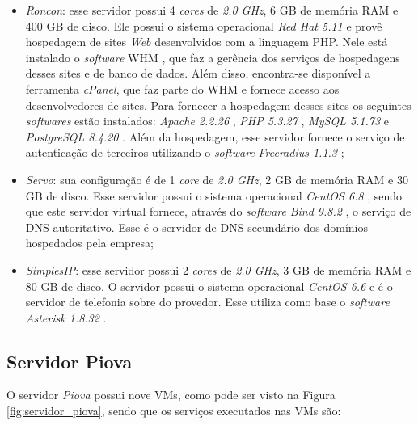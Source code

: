 \begin{itemize}
 \item \textit{Roncon}: esse servidor possui 4 \textit{cores} de \textit{2.0 GHz}, 6 GB de memória \ac{RAM} e 400 GB de disco. 
 Ele possui o sistema operacional \textit{Red Hat 5.11} \cite{redhat} e provê hospedagem de sites \textit{Web} desenvolvidos com a linguagem 
 \ac{PHP}. Nele está instalado o \textit{software} \ac{WHM} \cite{whm}, que faz a gerência dos serviços de hospedagens desses sites e de banco de 
 dados. Além disso, encontra-se disponível a ferramenta \textit{cPanel}, que faz parte do \ac{WHM} e fornece acesso aos desenvolvedores de
 sites. Para fornecer a hospedagem desses sites os seguintes \textit{softwares} estão instalados: \textit{Apache 2.2.26} \cite{apache}, 
 \textit{\ac{PHP} 5.3.27} \cite{php}, \textit{MySQL 5.1.73} \cite{mysql} e \textit{PostgreSQL 8.4.20} \cite{postgres}.
 Além da hospedagem, esse servidor fornece o serviço de autenticação  de terceiros utilizando o \textit{software} 
 \textit{Freeradius 1.1.3} \cite{freeradius};
 
 \item \textit{Servo}: sua configuração é de 1 \textit{core} de \textit{2.0 GHz}, 2 GB de memória \ac{RAM} e 30 GB de disco. 
 Esse servidor possui o sistema operacional \textit{CentOS 6.8} \cite{centos}, sendo que este servidor virtual fornece, através do \textit{software} 
 \textit{Bind 9.8.2} \cite{bind}, o serviço de \ac{DNS} autoritativo. Esse é o servidor de \ac{DNS} secundário dos domínios hospedados pela empresa;
 
 \item \textit{SimplesIP}: esse servidor possui 2 \textit{cores} de \textit{2.0 GHz}, 3 GB de memória \ac{RAM} e 80 GB de disco. 
 O servidor possui o sistema operacional \textit{CentOS 6.6} \cite{centos} e é o servidor de telefonia sobre  do provedor. Esse utiliza 
 como base o \textit{software} \textit{Asterisk 1.8.32} \cite{asterisk}.
\end{itemize}

\subsection{Servidor Piova}
\label{section:serv_piova}

O servidor \textit{Piova} possui nove \acp{VM}, como pode ser visto na Figura \ref{fig:servidor_piova}, sendo que os serviços executados nas 
\acp{VM} são:

